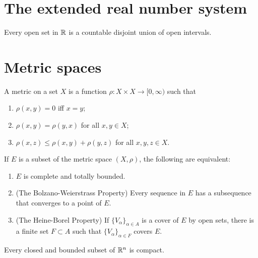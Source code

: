 \section{The extended real number system}

\begin{proposition}
Every open set in $\mathbb{R}$ is a countable disjoint union of open intervals.
\end{proposition}

\section{Metric spaces}

\begin{definition}[Metric]
A metric on a set $X$ is a function $\rho : X \times X \to [0, \infty)$ such that 
\begin{enumerate}
    \item $\rho(x, y) = 0$ iff $x = y$;
    \item $\rho(x, y) = \rho(y, x)$ for all $x, y \in X$;
    \item $\rho(x, z) \le \rho (x, y) + \rho(y, z)$ for all $x, y, z \in X$.
\end{enumerate}
\end{definition}

\begin{theorem}
If $E$ is a subset of the metric space $(X, \rho)$, the following are equivalent:
\begin{enumerate}
    \item $E$ is complete and totally bounded.
    \item (The Bolzano-Weierstrass Property) Every sequence in $E$ has a subsequence that converges to a point of $E$.
    \item (The Heine-Borel Property) If $\{ V_{\alpha} \}_{\alpha \in A}$ is a cover of $E$ by open sets, there is a finite set $F \subset A$ such that $\{ V_{\alpha} \}_{\alpha \in F}$ covers $E$.
\end{enumerate}
\end{theorem}

\begin{theorem}
Every closed and bounded subset of $\mathbb{R}^n$ is compact.
\end{theorem}